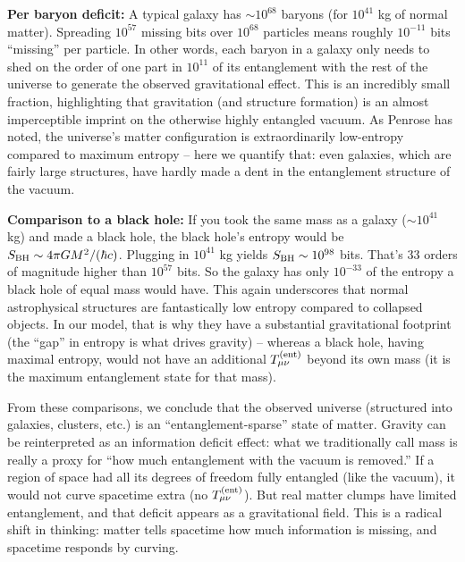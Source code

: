 \documentclass[11pt]{article}
\begin{document}
\textbf{Per baryon deficit:} A typical galaxy has $\sim 10^{68}$ baryons (for $10^{41}$ kg of normal matter). Spreading $10^{57}$ missing bits over $10^{68}$ particles means roughly $10^{-11}$ bits “missing” per particle​. In other words, each baryon in a galaxy only needs to shed on the order of one part in $10^{11}$ of its entanglement with the rest of the universe to generate the observed gravitational effect. This is an incredibly small fraction, highlighting that gravitation (and structure formation) is an almost imperceptible imprint on the otherwise highly entangled vacuum. As Penrose has noted, the universe’s matter configuration is extraordinarily low-entropy compared to maximum entropy – here we quantify that: even galaxies, which are fairly large structures, have hardly made a dent in the entanglement structure of the vacuum​.

\textbf{Comparison to a black hole:} If you took the same mass as a galaxy ($\sim 10^{41}$ kg) and made a black hole, the black hole’s entropy would be $S_{\rm BH} \sim 4\pi G M^2/(\hbar c)$. Plugging in $10^{41}$ kg yields $S_{\rm BH} \sim 10^{98}$ bits​. That’s 33 orders of magnitude higher than $10^{57}$ bits. So the galaxy has only $10^{-33}$ of the entropy a black hole of equal mass would have​. This again underscores that normal astrophysical structures are fantastically low entropy compared to collapsed objects. In our model, that is why they have a substantial gravitational footprint (the “gap” in entropy is what drives gravity) – whereas a black hole, having maximal entropy, would not have an additional $T_{\mu\nu}^{\rm (ent)}$ beyond its own mass (it is the maximum entanglement state for that mass).

From these comparisons, we conclude that the observed universe (structured into galaxies, clusters, etc.) is an “entanglement-sparse” state of matter​. Gravity can be reinterpreted as an information deficit effect: what we traditionally call mass is really a proxy for “how much entanglement with the vacuum is removed.” If a region of space had all its degrees of freedom fully entangled (like the vacuum), it would not curve spacetime extra (no $T_{\mu\nu}^{\rm (ent)}$). But real matter clumps have limited entanglement, and that deficit appears as a gravitational field. This is a radical shift in thinking: matter tells spacetime how much information is missing, and spacetime responds by curving.
\end{document}
